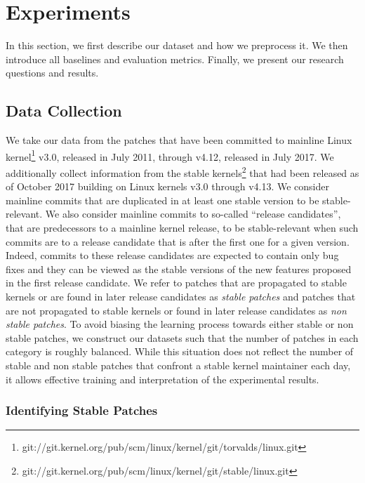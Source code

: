 \section{Experiments}
\label{sec:exp}

In this section, we first describe our dataset and how we preprocess it. We
then introduce all baselines and evaluation metrics. Finally, we present
our research questions and results.

\subsection{Data Collection}
\label{sec:data}

We take our data from the patches that have been committed to mainline
Linux
kernel\footnote{git://git.kernel.org/pub/scm/linux/kernel/git/torvalds/linux.git}
v3.0, released in July 2011, through v4.12, released in July 2017.  We
additionally collect information from the stable
kernels\footnote{git://git.kernel.org/pub/scm/linux/kernel/git/stable/linux.git}
that had been released as of October 2017 building on Linux kernels v3.0
through v4.13.  We consider mainline commits that are duplicated in at
least one stable version to be stable-relevant.  We also consider mainline
commits to so-called ``release candidates'', that are predecessors to a
mainline kernel release, to be stable-relevant when such commits are to a
release candidate that is after the first one for a given version.  Indeed,
commits to these release candidates are expected to contain only bug fixes
and they can be viewed as the stable
versions of the new features proposed in the first release
candidate.  We refer to patches that are propagated to stable kernels or
are found in later release candidates as {\em stable patches} and patches
that are not propagated to stable kernels or found in later release
candidates as {\em non stable patches}.  To avoid biasing the learning
process towards either stable or non stable patches, we construct our
datasets such that the number of patches in each category is roughly
balanced.  While this situation does not reflect the number of stable and
non stable patches that confront a stable kernel maintainer each day, it
allows effective training and interpretation of the experimental results.

\subsubsection{Identifying Stable Patches}
\label{sec:stable_patch}

